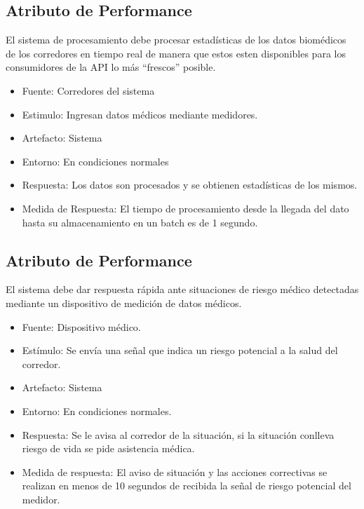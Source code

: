\subsection{Atributo de Performance}

El sistema de procesamiento debe procesar estadísticas de los
datos biomédicos de los corredores en tiempo real de manera que
estos esten disponibles para los consumidores de la API lo más
``frescos'' posible.

\begin{itemize}
\itemsep1pt\parskip0pt
\item
	Fuente: Corredores del sistema
\item
	Estimulo: Ingresan datos médicos mediante medidores.
\item
	Artefacto: Sistema
\item
	Entorno: En condiciones normales
\item
	Respuesta: Los datos son procesados y se obtienen estadísticas de los mismos.
\item
	Medida de Respuesta: El tiempo de procesamiento desde la llegada del dato hasta su almacenamiento en un batch es de 1 segundo.
\end{itemize} 

\subsection{Atributo de Performance}

El sistema debe dar respuesta rápida ante situaciones de riesgo médico
detectadas mediante un dispositivo de medición de datos médicos.

\begin{itemize}
\itemsep1pt\parskip0pt
\item
  Fuente: Dispositivo médico.
\item
  Estímulo: Se envía una señal que indica un riesgo potencial a la salud
  del corredor.
\item
  Artefacto: Sistema
\item
  Entorno: En condiciones normales.
\item
  Respuesta: Se le avisa al corredor de la situación, si la situación
  conlleva riesgo de vida se pide asistencia médica.
\item
  Medida de respuesta: El aviso de situación y las acciones correctivas
  se realizan en menos de 10 segundos de recibida la señal de riesgo
  potencial del medidor.
\end{itemize}

